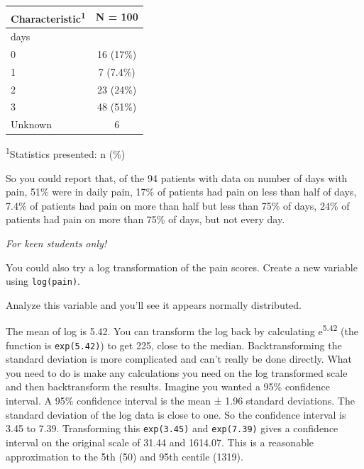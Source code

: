 \documentclass[]{book}
\newenvironment{Shaded}{\begin{snugshade}}{\end{snugshade}}
\newcommand{\DataTypeTok}[1]{\textcolor[rgb]{0.13,0.29,0.53}{#1}}
\newcommand{\KeywordTok}[1]{\textcolor[rgb]{0.13,0.29,0.53}{\textbf{#1}}}
\newcommand{\NormalTok}[1]{#1}
\newcommand{\OperatorTok}[1]{\textcolor[rgb]{0.81,0.36,0.00}{\textbf{#1}}}
\newcommand{\StringTok}[1]{\textcolor[rgb]{0.31,0.60,0.02}{#1}}
\begin{document}
\captionsetup[table]{labelformat=empty,skip=1pt}
\begin{longtable}{lc}
\toprule
\textbf{Characteristic}\textsuperscript{1} & \textbf{N = 100} \\ 
\midrule
days &  \\ 
0 & 16 (17\%) \\ 
1 & 7 (7.4\%) \\ 
2 & 23 (24\%) \\ 
3 & 48 (51\%) \\ 
Unknown & 6 \\ 
\bottomrule
\end{longtable}
\vspace{-5mm}
\begin{minipage}{\linewidth}
\textsuperscript{1}Statistics presented: n (\%) \\ 
\end{minipage}

So you could report that, of the 94 patients with data on number of days
with pain, 51\% were in daily pain, 17\% of patients had pain on less
than half of days, 7.4\% of patients had pain on more than half but less
than 75\% of days, 24\% of patients had pain on more than 75\% of days,
but not every day.

\emph{For keen students only!}

You could also try a log transformation of the pain scores. Create a new
variable using \texttt{log(pain)}.

\begin{Shaded}
\end{Shaded}

Analyze this variable and you'll see it appears normally distributed.

The mean of log is 5.42. You can transform the log back by calculating
e\textsuperscript{5.42} (the function is \texttt{exp(5.42)}) to get 225,
close to the median. Backtransforming the standard deviation is more
complicated and can't really be done directly. What you need to do is
make any calculations you need on the log transformed scale and then
backtransform the results. Imagine you wanted a 95\% confidence
interval. A 95\% confidence interval is the mean ± 1.96 standard
deviations. The standard deviation of the log data is close to one. So
the confidence interval is 3.45 to 7.39. Transforming this
\texttt{exp(3.45)} and \texttt{exp(7.39)} gives a confidence interval on
the original scale of 31.44 and 1614.07. This is a reasonable
approximation to the 5th (50) and 95th centile (1319).
\end{document}
